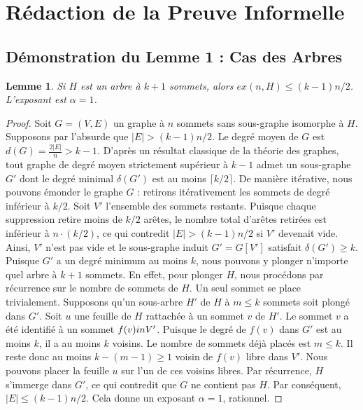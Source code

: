 \documentclass[12pt,a4paper]{article}
\newtheorem{lemma}{Lemme}
\begin{document}
\section{Rédaction de la Preuve Informelle}

\subsection{Démonstration du Lemme 1 : Cas des Arbres}
\begin{lemma}
Si $H$ est un arbre à $k+1$ sommets, alors $ex(n, H) \leq (k-1)n/2$. L'exposant est $\alpha = 1$.
\end{lemma}
\begin{proof}
Soit $G = (V, E)$ un graphe à $n$ sommets sans sous-graphe isomorphe à $H$. Supposons par l'absurde que $|E| > (k-1)n/2$.
Le degré moyen de $G$ est $d(G) = \frac{2|E|}{n} > k-1$.
D'après un résultat classique de la théorie des graphes, tout graphe de degré moyen strictement supérieur à $k-1$ admet un sous-graphe $G'$ dont le degré minimal $\delta(G')$ est au moins $\lceil k/2 \rceil$.
De manière itérative, nous pouvons émonder le graphe $G$ : retirons itérativement les sommets de degré inférieur à $k/2$. Soit $V'$ l'ensemble des sommets restants.
Puisque chaque suppression retire moins de $k/2$ arêtes, le nombre total d'arêtes retirées est inférieur à $n \cdot (k/2)$, ce qui contredit $|E| > (k-1)n/2$ si $V'$ devenait vide.
Ainsi, $V'$ n'est pas vide et le sous-graphe induit $G' = G[V']$ satisfait $\delta(G') \geq k$.
Puisque $G'$ a un degré minimum au moins $k$, nous pouvons y plonger n'importe quel arbre à $k+1$ sommets.
En effet, pour plonger $H$, nous procédons par récurrence sur le nombre de sommets de $H$. Un seul sommet se place trivialement.
Supposons qu'un sous-arbre $H'$ de $H$ à $m \leq k$ sommets soit plongé dans $G'$. Soit $u$ une feuille de $H$ rattachée à un sommet $v$ de $H'$. Le sommet $v$ a été identifié à un sommet $f(v) \\in V'$.
Puisque le degré de $f(v)$ dans $G'$ est au moins $k$, il a au moins $k$ voisins. Le nombre de sommets déjà placés est $m \leq k$.
Il reste donc au moins $k - (m-1) \geq 1$ voisin de $f(v)$ libre dans $V'$. Nous pouvons placer la feuille $u$ sur l'un de ces voisins libres.
Par récurrence, $H$ s'immerge dans $G'$, ce qui contredit que $G$ ne contient pas $H$.
Par conséquent, $|E| \leq (k-1)n/2$. Cela donne un exposant $\alpha = 1$, rationnel.
\end{proof}
\end{document}
